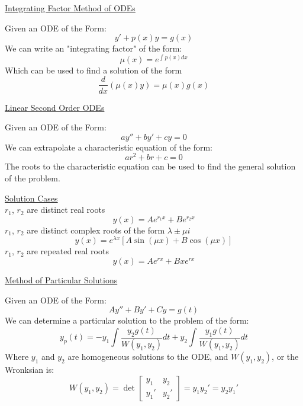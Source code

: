 \documentclass{article}
\begin{document}
\begin{center}
    \underline{Integrating Factor Method of ODEs}    
\end{center}

\begin{multicols}{2}
    \begin{center}
        Given an ODE of the Form:
        \[
            y' + p(x)y = g(x)
        \]
        We can write an "integrating factor" of the form:
        \[
            \mu(x) = e^{\int p(x)dx}
        \]
        \vfill\null\columnbreak
        Which can be used to find a solution of the form
        \[
            \frac{d}{dx}(\mu(x)y) = \mu(x)g(x)
        \]
    \end{center}
\end{multicols}


\begin{center}
    \underline{Linear Second Order ODEs}
    \begin{multicols}{2}
    Given an ODE of the Form:
        \[
            ay'' + by' + cy = 0
        \]
        We can extrapolate a characteristic equation of the form:
        \[
            ar^2 + br + c = 0
        \]
        The roots to the characteristic equation can be used to find the general solution of the problem.
        
    
    \vfill\null\columnbreak
    \underline{Solution Cases}
    \medskip\\
    $r_1$, $r_2$ are distinct real roots
    \[
        y(x) = Ae^{r_1x} + Be^{r_2x}
    \]
    $r_1$, $r_2$ are distinct complex roots of the form $\lambda \pm \mu i$
    \[
        y(x) = e^{\lambda x}\left[A\sin(\mu x) + B\cos(\mu x)\right]
    \]
    $r_1$, $r_2$ are repeated real roots
    \[
        y(x) = Ae^{rx} + Bxe^{rx}
    \]
        
    \end{multicols}
\end{center}

\begin{center}
    \underline{Method of Particular Solutions}
    \begin{multicols}{2}
        Given an ODE of the Form:
        \[
            Ay'' + By' + Cy = g(t)
        \]
        We can determine a particular solution to the problem of the form:
        \[
            y_p(t) = -y_1\int{\frac{y_2g(t)}{W(y_1,y_2)}dt} + y_2\int{\frac{y_1 g(t)}{W(y_1,y_2)}dt}
        \]
        \vfill\null\columnbreak
        Where $y_1$ and $y_2$ are homogeneous solutions to the ODE,
        and $W(y_1, y_2)$, or the Wronksian is:
        \[
            W(y_1,y_2) = \det
            \begin{bmatrix}
                    y_1 & y_2\\
                    y_1' & y_2'
            \end{bmatrix}
            = y_1y_2' = y_2y_1'
        \]
    \end{multicols}
\end{center}
\end{document}
